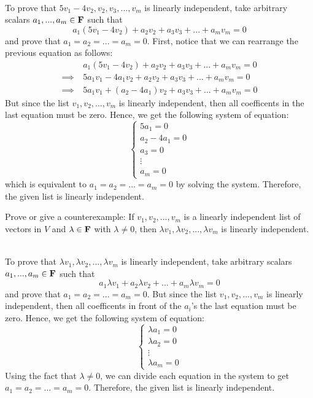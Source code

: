 \begin{solution}
    \\ To prove that $5v_1 - 4v_2, v_2, v_3, ..., v_m$ is linearly independent, take arbitrary scalars $a_1,...,a_m \in \mathbf{F}$ such that 
    $$a_1(5v_1 - 4v_2) + a_2v_2 + a_3 v_3 +  ... + a_m v_m =0$$
    and prove that $a_1 = a_2 = ... = a_m =0$. First, notice that we can rearrange the previous equation as follows:
    \begin{align*}
        & a_1(5v_1 - 4v_2) + a_2v_2 + a_3 v_3 +  ... + a_m v_m =0 \\
        \implies \ & 5a_1v_1 - 4a_1v_2 + a_2v_2 + a_3 v_3 +  ... + a_m v_m =0 \\
        \implies \ & 5a_1v_1 + (a_2 - 4a_1)v_2 + a_3 v_3 +  ... + a_m v_m =0
    \end{align*}
    But since the list $v_1, v_2, ..., v_m$ is linearly independent, then all coefficents in the last equation must be zero. Hence, we get the following system of equation:
    $$\begin{cases} 5a_1 = 0 \\ a_2 - 4a_1 = 0 \\ a_3 = 0 \\ \vdots \\ a_m = 0 \end{cases}$$
    which is equivalent to $a_1 = a_2 = ... = a_m =0$ by solving the system. Therefore, the given list is linearly independent. \\
\end{solution}

\begin{exercise}
    Prove or give a counterexample: If $v_1, v_2, ..., v_m$ is a linearly independent list of vectors in $V$ and $\lambda \in \mathbf{F}$ with $\lambda \neq 0$, then $\lambda v_1, \lambda v_2, ..., \lambda v_m$ is linearly independent. \\
\end{exercise}

\begin{solution}
    \\ To prove that $\lambda v_1, \lambda v_2, ..., \lambda v_m$ is linearly independent, take arbitrary scalars $a_1,...,a_m \in \mathbf{F}$ such that 
    $$a_1\lambda v_1 + a_2\lambda v_2 + ... + a_m\lambda v_m = 0$$
    and prove that $a_1 = a_2 = ... = a_m =0$. But since the list $v_1, v_2, ..., v_m$ is linearly independent, then all coefficents in front of the $a_i$'s the last equation must be zero. Hence, we get the following system of equation:
    $$\begin{cases} \lambda a_1 = 0 \\ \lambda a_2 = 0 \\ \vdots \\ \lambda a_m = 0 \end{cases}$$
    Using the fact that $\lambda \neq 0$, we can divide each equation in the system to get $a_1 = a_2 = ... = a_m =0$. Therefore, the given list is linearly independent. \\
\end{solution}

